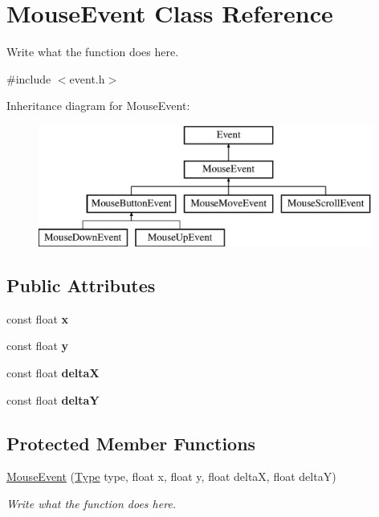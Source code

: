 \hypertarget{classMouseEvent}{\section{Mouse\+Event Class Reference}
\label{classMouseEvent}
}


Write what the function does here.  




{\ttfamily \#include $<$event.\+h$>$}

Inheritance diagram for Mouse\+Event\+:\begin{figure}[H]
\begin{center}
\leavevmode
\includegraphics[height=4.000000cm]{classMouseEvent}
\end{center}
\end{figure}
\subsection*{Public Attributes}
\begin{DoxyCompactItemize}
\item 
\hypertarget{classMouseEvent_a32d72e73b9a01bac66b70c249939e8bd}{const float {\bfseries x}}\label{classMouseEvent_a32d72e73b9a01bac66b70c249939e8bd}

\item 
\hypertarget{classMouseEvent_a1153ae91317c28fbed841dda37f98ff1}{const float {\bfseries y}}\label{classMouseEvent_a1153ae91317c28fbed841dda37f98ff1}

\item 
\hypertarget{classMouseEvent_aadd4befdf86a50c7b13fb2e8d90f370c}{const float {\bfseries delta\+X}}\label{classMouseEvent_aadd4befdf86a50c7b13fb2e8d90f370c}

\item 
\hypertarget{classMouseEvent_a2a94fbca0cc7587701ead66279e87b47}{const float {\bfseries delta\+Y}}\label{classMouseEvent_a2a94fbca0cc7587701ead66279e87b47}

\end{DoxyCompactItemize}
\subsection*{Protected Member Functions}
\begin{DoxyCompactItemize}
\item 
\hyperlink{classMouseEvent_a38e3202976fe08a74713bbb3326004c6}{Mouse\+Event} (\hyperlink{classEvent_a2abf13b5be49315e9e362af02029f058}{Type} type, float x, float y, float delta\+X, float delta\+Y)
\begin{DoxyCompactList}\small\item\em Write what the function does here. \end{DoxyCompactList}\end{DoxyCompactItemize}
